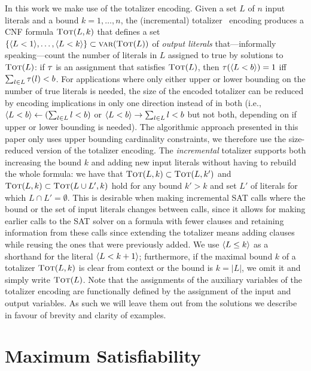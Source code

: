 In this work we make use of the totalizer encoding.
Given a set $L$ of $n$ input literals and a bound $k=1, \ldots, n$, the (incremental) totalizer~\autocites{DBLP:conf/cp/BailleuxB03,DBLP:conf/cp/MartinsJML14} encoding produces a CNF formula $\textsc{Tot}(L, k)$ that defines a set $\{\langle L < 1 \rangle, \ldots, \langle L < k \rangle\} \subset \textsc{var}(\textsc{Tot}(L))$ of \emph{output literals} that---informally speaking---count the number of literals in $L$ assigned to true by solutions to $\textsc{Tot}(L)$:
if $\tau$ is an assignment that satisfies $\textsc{Tot}(L)$, then $\tau(\langle L < b \rangle) = 1$ iff $\sum_{l \in L} \tau(l) < b$.
For applications where only either upper or lower bounding on the number of true literals is needed, the size of the encoded totalizer can be reduced by encoding implications in only one direction instead of in both (i.e., $\langle L < b \rangle \leftarrow (\sum_{l \in L} l < b)$ or $\langle L < b \rangle \rightarrow \sum_{l \in L} l < b$ but not both, depending on if upper or lower bounding is needed).
The algorithmic approach presented in this paper only uses upper bounding cardinality constraints, we therefore use the size-reduced version of the totalizer encoding.
The \emph{incremental} totalizer supports both increasing the bound $k$ and adding new input literals without having to rebuild the whole formula:
we have that $\textsc{Tot}(L, k) \subset \textsc{Tot}(L, k')$ and $\textsc{Tot}(L, k) \subset  \textsc{Tot}(L \cup L', k)$ hold for any bound $k' > k$ and set $L'$ of literals for which $L \cap L' =  \emptyset$. 
This is desirable when making incremental SAT calls where the bound or the set of input literals changes between calls, since it allows for making earlier calls to the SAT solver on a formula with fewer clauses and retaining information from these calls since extending the totalizer means adding clauses while reusing the ones that were previously added.
We use $\langle L \leq k \rangle$ as a shorthand for the literal $\langle L < k+1 \rangle$;
furthermore, if the maximal bound $k$ of a totalizer $\textsc{Tot}(L,k)$ is clear from context or the bound is $k=|L|$, we omit it and simply write $\textsc{Tot}(L)$.
Note that the assignments of the auxiliary variables of the totalizer encoding are functionally defined by the assignment of the input and output variables.
As such we will leave them out from the solutions we describe in favour of brevity and clarity of examples. 

\section{Maximum Satisfiability\label{sec:max-sat}}

